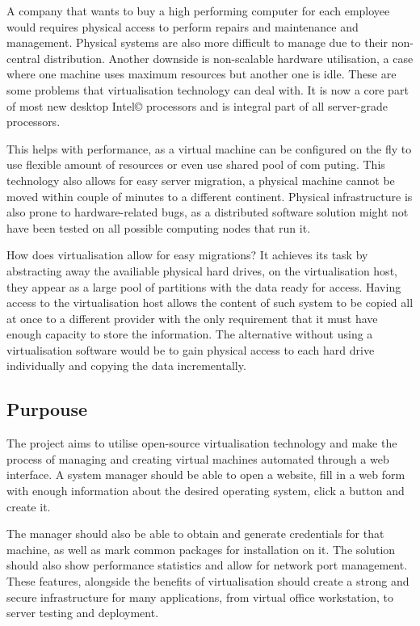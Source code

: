 \documentclass{article}
\begin{document}
  A company that wants to buy a high performing computer for each employee would requires physical access to perform repairs and maintenance and management. Physical systems are also more difficult to manage due to their non-central distribution. Another downside is non-scalable hardware utilisation, a case where one machine uses maximum resources but another one is idle. These are some problems that virtualisation technology can deal with.  It is now a core part of most new desktop Intel© processors and is integral part of all server-grade processors.
  
  This helps with performance, as a virtual machine can be configured on the fly to use flexible amount of resources or even use shared pool of com puting. This technology also allows for easy server migration, a physical machine cannot be moved within couple of minutes to a different continent. Physical infrastructure is also prone to hardware-related bugs, as a distributed software solution might not have been tested on all possible computing nodes that run it.
  
  How does virtualisation allow for easy migrations? It achieves its task by abstracting away the availiable physical hard drives, on the virtualisation host, they appear as a large pool of partitions with the data ready for access. Having access to the virtualisation host allows the content of such system to be copied all at once to a different provider with the only requirement that it must have enough capacity to store the information. The alternative without using a virtualisation software would be to gain physical access to each hard drive individually and copying the data incrementally.
  
  \subsection{Purpouse}
   The project aims to utilise open-source virtualisation technology and make the process of managing and creating virtual machines automated through a web interface. A system manager should be able to open a website, fill in a web form with enough information about the desired operating system, click a button and create it. 
   
   The manager should also be able to obtain and generate credentials for that machine, as well as mark common packages for installation on it. The solution should also show performance statistics and allow for network port management. These features, alongside the benefits of virtualisation should create a strong and secure infrastructure for many applications, from virtual office workstation, to server testing and deployment.
   
\end{document}
